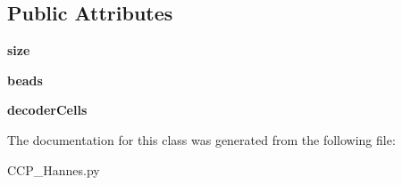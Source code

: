 \subsection*{Public Attributes}
\begin{DoxyCompactItemize}
\item 
\mbox{\label{class_c_c_p___hannes_1_1_well__np_array_ae2d7e1d206125d2565c35b97f57ab819}} 
{\bfseries size}
\item 
\mbox{\label{class_c_c_p___hannes_1_1_well__np_array_acf36275f45a50a882d3f6f1edfb3e84d}} 
{\bfseries beads}
\item 
\mbox{\label{class_c_c_p___hannes_1_1_well__np_array_a8a744dba83859e9592fa5b61d799fc2b}} 
{\bfseries decoder\+Cells}
\end{DoxyCompactItemize}


The documentation for this class was generated from the following file\+:\begin{DoxyCompactItemize}
\item 
C\+C\+P\+\_\+\+Hannes.\+py\end{DoxyCompactItemize}
